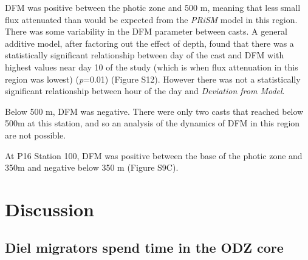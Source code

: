 \documentclass[]{article}
\begin{document}
DFM was positive between the photic zone and 500 m, meaning that less
small flux attenuated than would be expected from the \emph{PRiSM} model
in this region. There was some variability in the DFM parameter between
casts. A general additive model, after factoring out the effect of
depth, found that there was a statistically significant relationship
between day of the cast and DFM with highest values near day 10 of the
study (which is when flux attenuation in this region was lowest)
(\emph{p}=0.01) (Figure S12). However there was not a statistically
significant relationship between hour of the day and \emph{Deviation
from Model}.

Below 500 m, DFM was negative. There were only two casts that reached
below 500m at this station, and so an analysis of the dynamics of DFM in
this region are not possible.

At P16 Station 100, DFM was positive between the base of the photic zone
and 350m and negative below 350 m (Figure S9C).

\hypertarget{discussion}{%
\section{Discussion}\label{discussion}}

\hypertarget{diel-migrators-spend-time-in-the-odz-core}{%
\subsection{Diel migrators spend time in the ODZ
core}\label{diel-migrators-spend-time-in-the-odz-core}}
\end{document}
